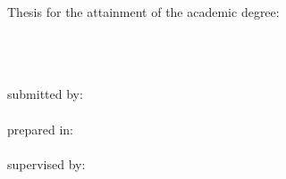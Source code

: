 
\null
\vspace{2\baselineskip}
\noindent
Thesis for the attainment of the academic degree: \\
\tDegree \\
\vspace{\baselineskip}
\noindent \\
\tTitle \\
\vspace{\baselineskip}

\noindent
submitted by: \\
\tAuthor \\

\noindent
prepared in: \\
\tDepartment \\

\noindent
supervised by: \\
\tSupervisor \\

\noindent
\tSubmissionMonth{}~\tSubmissionYear \\
\vspace{5\baselineskip}
